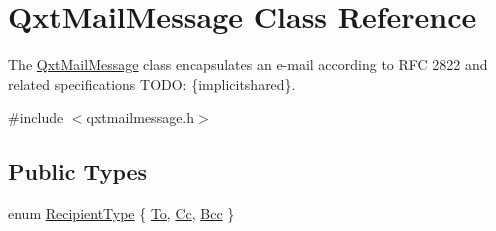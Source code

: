 \hypertarget{class_qxt_mail_message}{\section{Qxt\-Mail\-Message Class Reference}
\label{class_qxt_mail_message}
}


The \hyperlink{class_qxt_mail_message}{Qxt\-Mail\-Message} class encapsulates an e-\/mail according to R\-F\-C 2822 and related specifications T\-O\-D\-O\-: \{implicitshared\}.  




{\ttfamily \#include $<$qxtmailmessage.\-h$>$}

\subsection*{Public Types}
\begin{DoxyCompactItemize}
\item 
enum \hyperlink{class_qxt_mail_message_af5ef6ffaabd7588ace94f823a7542180}{Recipient\-Type} \{ \hyperlink{class_qxt_mail_message_af5ef6ffaabd7588ace94f823a7542180ae25632e01c04b723a317fe132b816009}{To}, 
\hyperlink{class_qxt_mail_message_af5ef6ffaabd7588ace94f823a7542180ac51771755a761111128bb70517809547}{Cc}, 
\hyperlink{class_qxt_mail_message_af5ef6ffaabd7588ace94f823a7542180a781969af0a6c516822ae3074b896c6e1}{Bcc}
 \}
\end{DoxyCompactItemize}
